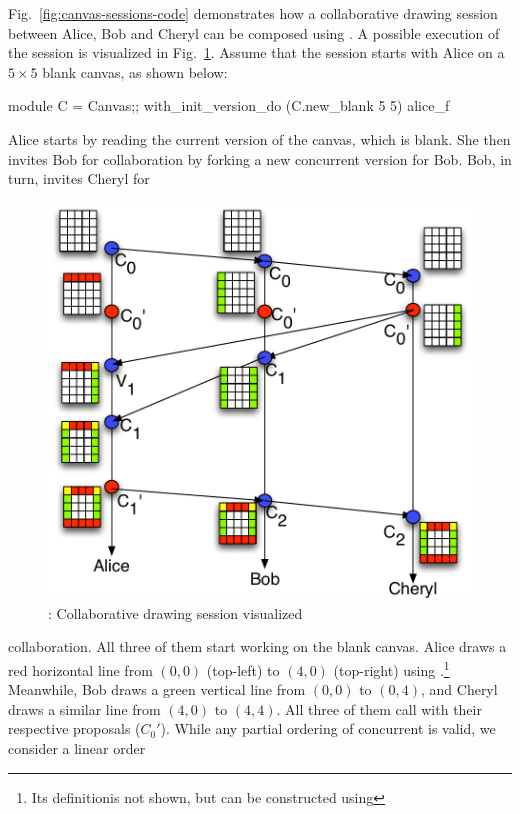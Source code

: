 Fig.~\ref{fig:canvas-sessions-code} demonstrates how a collaborative
drawing session between Alice, Bob and Cheryl can be composed using
\name. A possible execution of the session is visualized in
Fig.~\ref{fig:canvas-sessions}. Assume that the session starts with
Alice on a $5\times 5$ blank canvas, as shown below:
\begin{ocaml}
  module C = Canvas;;
  with_init_version_do (C.new_blank 5 5) alice_f
\end{ocaml}
Alice starts by reading the current version of the canvas, which is
blank. She then invites Bob for collaboration by forking a new
concurrent version for Bob. Bob, in turn, invites Cheryl for
\begin{figure}
\centering
\includegraphics[scale=0.6]{Figures/canvas-sessions}
\caption{\drawsome: Collaborative drawing session visualized}
\label{fig:canvas-sessions}
\end{figure}
collaboration. All three of them start working on the blank canvas.
Alice draws a red horizontal line from $(0,0)$ (top-left) to $(4,0)$
(top-right) using .\footnote{Its definitionis not
  shown, but can be constructed using } Meanwhile, Bob
draws a green vertical line from $(0,0)$ to $(0,4)$, and Cheryl draws
a similar line from $(4,0)$ to $(4,4)$. All three of them call
 with their respective proposals ($C_0'$). While any partial
ordering of concurrent  is valid, we consider a linear order
